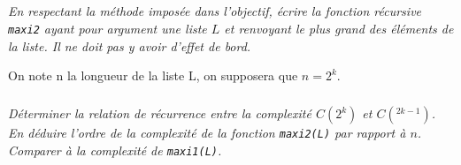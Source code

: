 \documentclass[10pt,fleqn]{article} %
\begin{document}
\begin{multicols}{2}
\subparagraph{}
\textit{En respectant la méthode imposée dans l’objectif, écrire la fonction récursive \texttt{maxi2} ayant pour argument une liste $L$ et renvoyant le plus grand des éléments de la liste. Il ne doit pas y avoir d’effet de bord.}

On note n la longueur de la liste L, on supposera que $n = 2^k$.

\subparagraph{}
\textit{Déterminer la relation de récurrence entre la complexité $C(2^k )$ et $C(^{2k-1})$. En déduire l’ordre de la complexité de la fonction \texttt{maxi2(L)} par rapport à $n$. Comparer à la complexité de \texttt{maxi1(L)}.}




\end{multicols}
\end{document}
